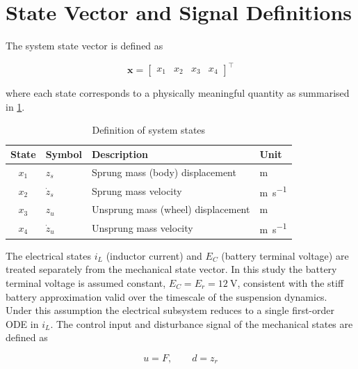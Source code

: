 \section{State Vector and Signal Definitions}
\label{sec:state_vector}

The system state vector is defined as

\begin{equation}
    \bm{x} =
    \begin{bmatrix}
        x_1 & x_2 & x_3 & x_4
    \end{bmatrix}^{\!\top}
    \label{eq:state_vector}
\end{equation}

where each state corresponds to a physically meaningful quantity as
summarised in \cref{tab:states}.

\begin{table}[htbp]
    \centering
    \caption{Definition of system states}
    \label{tab:states}
    \renewcommand{\arraystretch}{1.35}
    \begin{tabular}{clll}
        \toprule
        State & Symbol & Description & Unit \\
        \midrule
        $x_1$ & $z_s$       & Sprung mass (body) displacement    & \si{\metre}            \\
        $x_2$ & $\dot{z}_s$ & Sprung mass velocity               & \si{\metre\per\second} \\
        $x_3$ & $z_u$       & Unsprung mass (wheel) displacement & \si{\metre}            \\
        $x_4$ & $\dot{z}_u$ & Unsprung mass velocity             & \si{\metre\per\second} \\
        \bottomrule
    \end{tabular}
\end{table}

The electrical states $i_L$ (inductor current) and $E_C$ (battery
terminal voltage) are treated separately from the mechanical state
vector. In this study the battery terminal voltage is assumed constant,
$E_C = E_r = \SI{12}{\volt}$, consistent with the stiff battery
approximation valid over the timescale of the suspension dynamics.
Under this assumption the electrical subsystem reduces to a single
first-order ODE in $i_L$. The control input and disturbance signal of the mechanical states are
defined as

\begin{equation}
    u = F, \qquad d = z_r
    \label{eq:inputs}
\end{equation}

